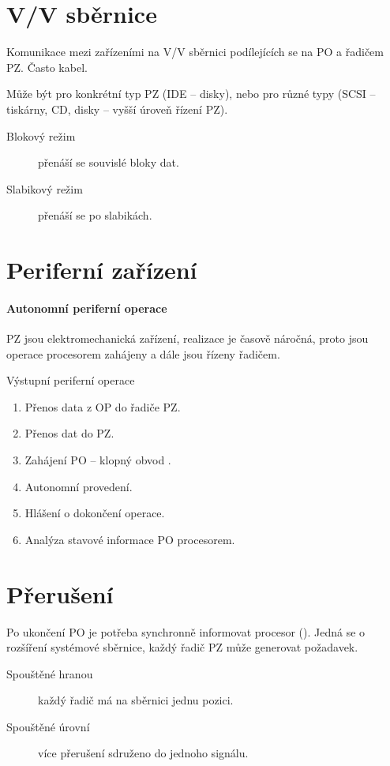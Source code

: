 \documentclass[a4paper, 11pt]{report}
\begin{document}
\section{V/V sběrnice}

Komunikace mezi zařízeními na V/V sběrnici podílejících se na PO a řadičem PZ. Často kabel.

Může být pro konkrétní typ PZ (IDE -- disky), nebo pro různé typy (SCSI -- tiskárny, CD, disky -- vyšší úroveň řízení PZ).

\begin{description}
	\item[Blokový režim] přenáší se souvislé bloky dat.
	\item[Slabikový režim] přenáší se po slabikách.
\end{description}

\section{Periferní zařízení}

\paragraph{Autonomní periferní operace}
PZ jsou elektromechanická zařízení, realizace je časově náročná, proto jsou operace procesorem zahájeny a dále jsou řízeny řadičem.

Výstupní periferní operace
\begin{enumerate}
	\item Přenos data z OP do řadiče PZ.
	\item Přenos dat do PZ.
	\item Zahájení PO -- klopný obvod .
	\item Autonomní provedení.
	\item Hlášení o dokončení operace.
	\item Analýza stavové informace PO procesorem.
\end{enumerate}

\section{Přerušení}

Po ukončení PO je potřeba synchronně informovat procesor (). Jedná se o rozšíření systémové sběrnice, každý řadič PZ může generovat požadavek.


\begin{description}
	\item[Spouštěné hranou] každý řadič má na sběrnici jednu pozici.
	\item[Spouštěné úrovní] více přerušení sdruženo do jednoho signálu.
\end{description}
\end{document}
